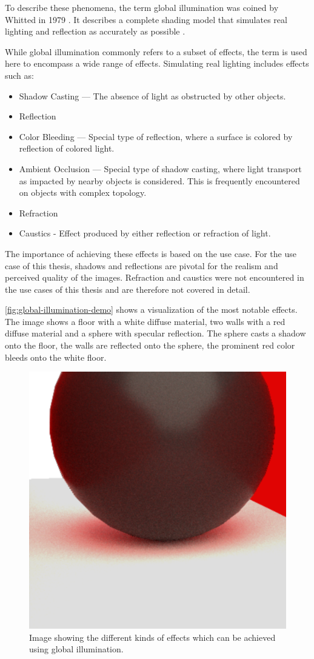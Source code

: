 To describe these phenomena, the term global illumination was coined by Whitted in 1979 \cite{whittedGlobalIllumination}. It describes a complete shading model that simulates real lighting and reflection as accurately as possible \cite{whitted2020OriginsOfGlobalIllumination}. 

While global illumination commonly refers to a subset of effects, the term is used here to encompass a wide range of effects. Simulating real lighting includes effects such as:

\begin{itemize}
  \item{Shadow Casting} — The absence of light as obstructed by other objects.
  \item{Reflection}
  \item{Color Bleeding} — Special type of reflection, where a surface is colored by reflection of colored light.
  \item{Ambient Occlusion} — Special type of shadow casting, where light transport as impacted by nearby objects is considered. This is frequently encountered on objects with complex topology.
  \item{Refraction}
  \item{Caustics} - Effect produced by either reflection or refraction of light.
\end{itemize}

The importance of achieving these effects is based on the use case. For the use case of this thesis, shadows and reflections are pivotal for the realism and perceived quality of the images. Refraction and caustics were not encountered in the use cases of this thesis and are therefore not covered in detail.

\autoref{fig:global-illumination-demo} shows a visualization of the most notable effects. The image shows a floor with a white diffuse material, two walls with a red diffuse material and a sphere with specular reflection. The sphere casts a shadow onto the floor, the walls are reflected onto the sphere, the prominent red color bleeds onto the white floor.

\begin{figure}[H]
  \centering
  \includegraphics[width=0.3\columnwidth]{resources/global-illumination-demonstration.png}
  \caption{Image showing the different kinds of effects which can be achieved using global illumination.}
  \label{fig:global-illumination-demo}
\end{figure}

